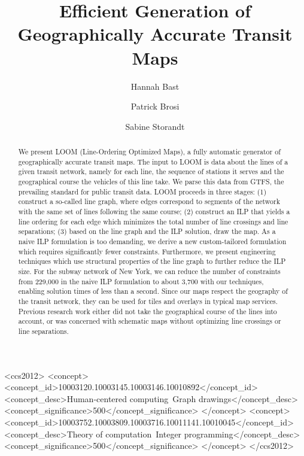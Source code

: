 \documentclass[sigconf]{acmart}
\begin{document}
\title{Efficient Generation of Geographically Accurate Transit Maps}

\author{Hannah Bast}

\author{Patrick Brosi}

\author{Sabine Storandt}

\begin{abstract}
We present LOOM (Line-Ordering Optimized Maps), a fully automatic generator of geographically accurate transit maps.
The input to LOOM is data about the lines of a given transit network, namely for each line, the sequence of stations it serves and the geographical course the vehicles of this line take. We parse this data from GTFS, the prevailing standard for public transit data.
LOOM proceeds in three stages:
	(1) construct a so-called line graph, where edges correspond to segments of the network with the same set of lines following the same course;
	(2) construct an ILP that yields a line ordering for each edge which minimizes the total number of line crossings and line separations;
	(3) based on the line graph and the ILP solution, draw the map.
As a naive ILP formulation is too demanding, we derive a new custom-tailored formulation which requires significantly fewer constraints. Furthermore, we present engineering techniques which use structural properties of the line graph to further reduce the ILP size. For the subway network of New York, we can reduce the number of constraints from 229,000 in the naive ILP formulation to about 3,700 with our techniques, enabling solution times of less than a second. Since our maps respect the geography of the transit network, they can be used for tiles and overlays in typical map services. Previous research work either did not take the geographical course of the lines into account, or was concerned with schematic maps without optimizing line crossings or line separations.
\end{abstract}

\def\UrlFont{\normalsize}

%
%
\begin{CCSXML}
<ccs2012>
<concept>
<concept_id>10003120.10003145.10003146.10010892</concept_id>
<concept_desc>Human-centered computing~Graph drawings</concept_desc>
<concept_significance>500</concept_significance>
</concept>
<concept>
<concept_id>10003752.10003809.10003716.10011141.10010045</concept_id>
<concept_desc>Theory of computation~Integer programming</concept_desc>
<concept_significance>500</concept_significance>
</concept>
</ccs2012>
\end{CCSXML}
\end{document}
